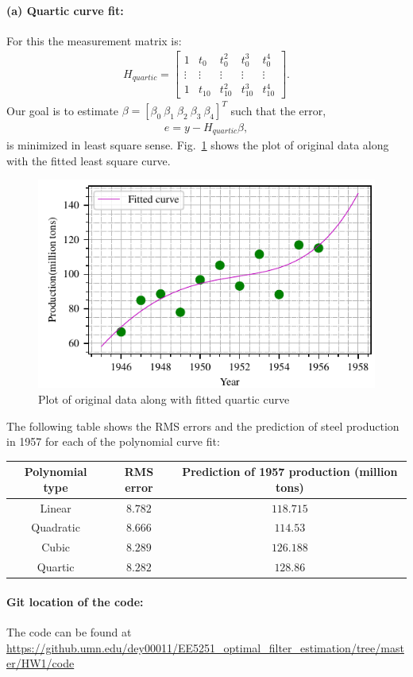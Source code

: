 \paragraph{(a) Quartic curve fit:}For this the measurement matrix is:
\begin{align*}
H_{quartic} = \begin{bmatrix}1 & t_0 & t_0^2 & t_0^3 & t_0^4\\ \vdots & \vdots & \vdots & \vdots & \vdots\\1 & t_{10} & t_{10}^2 & t_{10}^3 & t_{10}^4\end{bmatrix}.
\end{align*}
Our goal is to estimate $\beta = [\beta_0\ \beta_1\ \beta_2\ \beta_3\ \beta_4]^T$ such that the error,
\begin{align*}
e = y - H_{quartic}\beta,
\end{align*}
is minimized in least square sense. Fig.~\ref{fig:fit_quartic} shows the plot of original data along with the fitted least square curve.
\begin{figure}[h]
	\centering
	\includegraphics[scale=1.0,trim={0cm 0cm 0cm 0cm},clip]{./code/generatedPlots/fit_quartic.pdf}
	\caption{Plot of original data along with fitted quartic curve}
	\label{fig:fit_quartic}
\end{figure}
\newline
The following table shows the RMS errors and the prediction of steel production in 1957 for each of the polynomial curve fit:
\begin{center}
	\begin{tabular}{||c | c | c ||} 
		\hline
		Polynomial type & RMS error & Prediction of 1957 production (million tons)\\ [0.5ex] 
		\hline\hline
		Linear & $8.782$ & $118.715$\\
		\hline
		Quadratic & $8.666$ & $114.53$\\
		\hline
		Cubic & $8.289$ & $126.188$\\
		\hline
		Quartic & $8.282$ & $128.86$\\ [1ex]
		\hline
	\end{tabular}
\end{center}
\paragraph{Git location of the code:} The code can be found at\\
\url{https://github.umn.edu/dey00011/EE5251\_optimal\_filter\_estimation/tree/master/HW1/code}
 